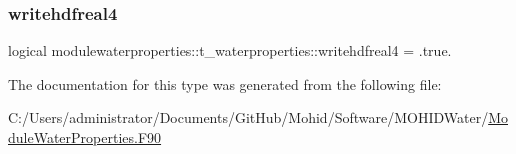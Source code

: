 \mbox{\label{structmodulewaterproperties_1_1t__waterproperties_a3fb14c0c6f0236dde822feaf8036c036}} 
\subsubsection{\texorpdfstring{writehdfreal4}{writehdfreal4}}
{\footnotesize\ttfamily logical modulewaterproperties\+::t\+\_\+waterproperties\+::writehdfreal4 = .true.\hspace{0.3cm}{\ttfamily [private]}}



The documentation for this type was generated from the following file\+:\begin{DoxyCompactItemize}
\item 
C\+:/\+Users/administrator/\+Documents/\+Git\+Hub/\+Mohid/\+Software/\+M\+O\+H\+I\+D\+Water/\mbox{\hyperlink{_module_water_properties_8_f90}{Module\+Water\+Properties.\+F90}}\end{DoxyCompactItemize}
